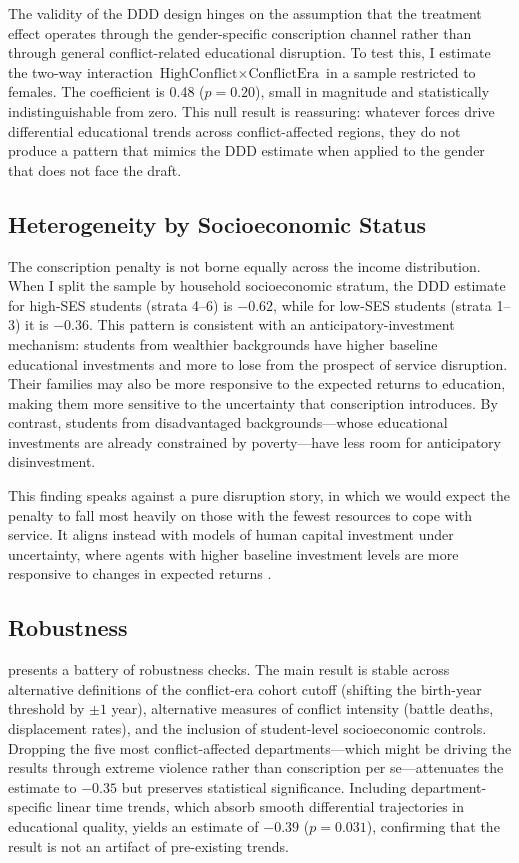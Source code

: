 \documentclass[12pt]{article}
\begin{document}
The validity of the DDD design hinges on the assumption that the treatment effect operates through the gender-specific conscription channel rather than through general conflict-related educational disruption. To test this, I estimate the two-way interaction $\text{HighConflict} \times \text{ConflictEra}$ in a sample restricted to females. The coefficient is 0.48 ($p = 0.20$), small in magnitude and statistically indistinguishable from zero. This null result is reassuring: whatever forces drive differential educational trends across conflict-affected regions, they do not produce a pattern that mimics the DDD estimate when applied to the gender that does not face the draft.

\subsection{Heterogeneity by Socioeconomic Status}

The conscription penalty is not borne equally across the income distribution. When I split the sample by household socioeconomic stratum, the DDD estimate for high-SES students (strata 4--6) is $-0.62$, while for low-SES students (strata 1--3) it is $-0.36$. This pattern is consistent with an anticipatory-investment mechanism: students from wealthier backgrounds have higher baseline educational investments and more to lose from the prospect of service disruption. Their families may also be more responsive to the expected returns to education, making them more sensitive to the uncertainty that conscription introduces. By contrast, students from disadvantaged backgrounds---whose educational investments are already constrained by poverty---have less room for anticipatory disinvestment.

This finding speaks against a pure disruption story, in which we would expect the penalty to fall most heavily on those with the fewest resources to cope with service. It aligns instead with models of human capital investment under uncertainty, where agents with higher baseline investment levels are more responsive to changes in expected returns \citep{card1999,card2001}.

\subsection{Robustness}

 presents a battery of robustness checks. The main result is stable across alternative definitions of the conflict-era cohort cutoff (shifting the birth-year threshold by $\pm 1$ year), alternative measures of conflict intensity (battle deaths, displacement rates), and the inclusion of student-level socioeconomic controls. Dropping the five most conflict-affected departments---which might be driving the results through extreme violence rather than conscription per se---attenuates the estimate to $-0.35$ but preserves statistical significance. Including department-specific linear time trends, which absorb smooth differential trajectories in educational quality, yields an estimate of $-0.39$ ($p = 0.031$), confirming that the result is not an artifact of pre-existing trends.
\end{document}

